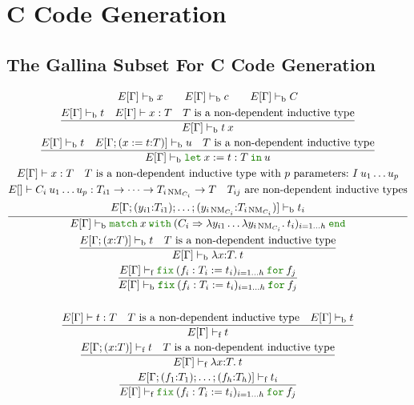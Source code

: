 \documentclass[a4paper,fleqn]{article}
\def\gallina{\textrm{Gallina}}
\newcommand{\kwlet}{\mbox{\color{mygreen}\ttfamily let}}
\newcommand{\kwin}{\mbox{\color{mygreen}\ttfamily in}}
\newcommand{\kwmatch}{\mbox{\color{mygreen}\ttfamily match}}
\newcommand{\kwwith}{\mbox{\color{mygreen}\ttfamily with}}
\newcommand{\kwend}{\mbox{\color{mygreen}\ttfamily end}}
\newcommand{\kwfix}{\mbox{\color{mygreen}\ttfamily fix}}
\newcommand{\kwfor}{\mbox{\color{mygreen}\ttfamily for}}
\newcommand{\lamT}[3]{\lambda #1\mathord{:}#2.\:#3}
\newcommand{\lamB}[1]{\lambda #1.\:}
\newcommand{\lassum}[2]{(#1\mathord{:}#2)}
\newcommand{\ldef}[3]{(#1:=#2\mathord{:}#3)}
\newcommand{\letin}[3]{\kwlet\:#1:=#2\:\kwin\:#3}
\newcommand{\match}[4]{\kwmatch\:#1\:\kwwith\:(#2 \Rightarrow #3)_{#4}\:\kwend}
\newcommand{\fix}[4]{\kwfix\:(#1 := #2)_{#3}\:\kwfor\:#4}
\DeclareMathOperator{\NM}{NM} %
\newcommand{\vdashb}{\vdash_{\textrm{b}}}
\newcommand{\vdashf}{\vdash_{\textrm{f}}}
\begin{document}
\section{C Code Generation}\label{sec:c-code-gen}
\subsection{The \gallina{} Subset For C Code Generation}\label{sec:gallinasubsetforcgen}
\begin{gather*}
  E[\Gamma] \vdashb x \qquad
  E[\Gamma] \vdashb c \qquad
  E[\Gamma] \vdashb C \\
  \dfrac{
    E[\Gamma] \vdashb t \quad
    E[\Gamma] \vdash x : T \quad
    \text{$T$ is a non-dependent inductive type}
  }{
    E[\Gamma] \vdashb t\:x
  } \\
  \dfrac{
    E[\Gamma] \vdashb t \quad
    E[\Gamma;\ldef{x}{t}{T}] \vdashb u \quad
    \text{$T$ is a non-dependent inductive type}
  }{
    E[\Gamma] \vdashb \letin{x}{t:T}{u}
  } \\
  \dfrac{
    \begin{gathered}
      E[\Gamma] \vdash x:T \quad
      \text{$T$ is a non-dependent inductive type with $p$ parameters:}~I\:u_1\ldots u_p \\
      E[] \vdash C_i\:u_1\ldots u_p: T_{i1} \rightarrow \dotsb \rightarrow T_{i\NM_{C_i}} \rightarrow T \quad
      \text{$T_{ij}$ are non-dependent inductive types} \\
      E[\Gamma;\lassum{y_{i1}}{T_{i1}};\ldots;\lassum{y_{i\NM_{C_i}}}{T_{i\NM_{C_i}}}] \vdashb t_i
    \end{gathered}
  }{
    E[\Gamma] \vdashb \match{x}{C_i}{\lambda y_{i1}\ldots\lamB{y_{i\NM_{C_i}}}t_i}{i=1\ldots h}
  } \\
  \dfrac{
    E[\Gamma;\lassum{x}{T}] \vdashb t \quad
    \text{$T$ is a non-dependent inductive type}
  }{
    E[\Gamma] \vdashb \lamT{x}{T}{t}
  } \\
  \dfrac{
    E[\Gamma] \vdashf \fix{f_i:T_i}{t_i}{i=1\ldots h}{f_j}
  }{
    E[\Gamma] \vdashb \fix{f_i:T_i}{t_i}{i=1\ldots h}{f_j}
  } \\
  \\
  \dfrac{
    E[\Gamma] \vdash t : T \quad
    \text{$T$ is a non-dependent inductive type} \quad
    E[\Gamma] \vdashb t
  }{
    E[\Gamma] \vdashf t
  } \\
  \dfrac{
    E[\Gamma;\lassum{x}{T}] \vdashf t \quad
    \text{$T$ is a non-dependent inductive type}
  }{
    E[\Gamma] \vdashf \lamT{x}{T}{t}
  } \\
  \dfrac{
    E[\Gamma;\lassum{f_1}{T_1};\ldots;\lassum{f_h}{T_h}] \vdashf t_i
  }{
    E[\Gamma] \vdashf \fix{f_i:T_i}{t_i}{i=1\ldots h}{f_j}
  }
\end{gather*}
\end{document}
